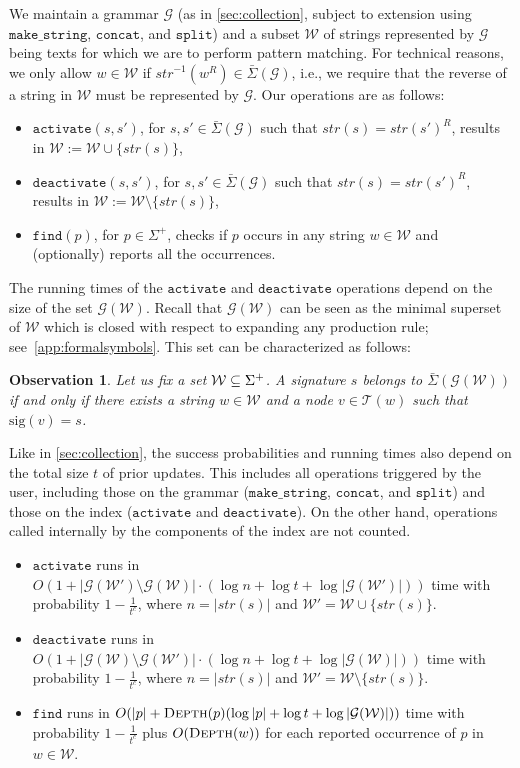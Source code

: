 \documentclass[a4paper]{article}
\newtheorem{observation}[theorem]{Observation}
\theoremstyle{remark}
\newcommand{\makeop}{\mathtt{make\_string}}
\newcommand{\actop}{\mathtt{activate}}
\newcommand{\dactop}{\mathtt{deactivate}}
\newcommand{\concop}{\mathtt{concat}}
\newcommand{\splitop}{\mathtt{split}}
\newcommand{\findop}{\mathtt{find}}
\newcommand{\sigs}{\bar{\Sigma}}
\newcommand{\depth}{\textsc{Depth}}
\newcommand{\grammar}{\mathcal{G}}
\newcommand{\stree}{\mathcal{T}}
\newcommand{\sstr}{\textit{str}}
\newcommand{\ussig}{\mathrm{sig}}
\newcommand{\coll}{\mathcal{W}}
\begin{document}
We maintain a grammar $\grammar$ (as in \cref{sec:collection}, subject to extension using $\makeop$, $\concop$, and $\splitop$) and a subset $\coll$
of strings represented by $\grammar$ being texts for which we are to perform pattern matching.
For technical reasons, we only allow $w\in \coll$ if $\sstr^{-1}(w^R)\in \sigs(\grammar)$,
i.e., we require that the reverse of a string in $\coll$ must be represented by $\grammar$.
Our operations are as follows:

\begin{itemize}
  \item $\actop(s,s')$, for $s,s'\in \sigs(\grammar)$ such that $\sstr(s)=\sstr(s')^R$, results in $\coll := \coll\cup \{\sstr(s)\}$,
  \item $\dactop(s,s')$, for $s,s'\in \sigs(\grammar)$ such that $\sstr(s)=\sstr(s')^R$, results in $\coll := \coll\setminus \{\sstr(s)\}$,
  \item $\findop(p)$, for $p\in \Sigma^+$, checks if $p$ occurs in any string $w\in \coll$ and (optionally) reports all the occurrences.
\end{itemize}

The running times of the $\actop$ and $\dactop$ operations depend on the size of the set $\grammar(\coll)$.
Recall that $\grammar(\coll)$ can be seen as the minimal superset of $\coll$ which is closed with respect
to expanding any production rule; see~\cref{app:formalsymbols}.
This set can be characterized as follows:
\begin{observation}\label{obs:ppm}
  Let us fix a set $\coll\sub \Sigma^+$. A signature $s$ belongs to $\sigs(\grammar(\coll))$
if and only if there exists a string $w\in \coll$ and a node $v\in \stree(w)$ such that $\ussig(v)=s$.
\end{observation}

Like in \cref{sec:collection}, the success probabilities and running times also depend on the total size $t$ of prior updates. This includes all operations triggered by the user,
including those on the grammar ($\makeop$, $\concop$, and $\splitop$) and those on the index ($\actop$ and $\dactop$).
On the other hand, operations called internally by the components of the index are not counted.
\begin{itemize}
  \item $\actop$ runs in $O(1+|\grammar(\coll')\setminus \grammar(\coll)|\cdot (\log n + \log t + \log|\grammar(\coll')|))$ time with probability $1-\frac{1}{t^c}$, where $n=|\sstr(s)|$ and  $\coll'=\coll\cup\{\sstr(s)\}$.
  \item $\dactop$ runs in $O(1+|\grammar(\coll)\setminus \grammar(\coll')|\cdot (\log n + \log t + \log|\grammar(\coll)|))$ time with probability $1-\frac{1}{t^c}$, where $n=|\sstr(s)|$ and $\coll'=\coll \setminus \{\sstr(s)\}$.
  \item $\findop$ runs in $O(|p|+\depth(p)(\log |p|+\log t + \log |\grammar(\coll)|))$ time with probability $1-\frac{1}{t^c}$ plus  $O(\depth(w))$ for each reported occurrence of $p$ in $w\in\coll$.
\end{itemize}
\end{document}

